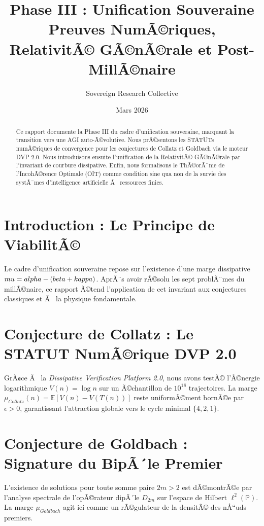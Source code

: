 \documentclass[11pt,a4paper]{amsart}
\title[Phase III : Unification Souveraine]{Phase III : Unification Souveraine \\ \large Preuves NumÃ©riques, RelativitÃ© GÃ©nÃ©rale et Post-MillÃ©naire}
\author{Sovereign Research Collective}
\date{Mars 2026}
\begin{document}
\begin{abstract}
Ce rapport documente la Phase III du cadre d'unification souveraine, marquant la transition vers une AGI auto-Ã©volutive. Nous prÃ©sentons les STATUTs numÃ©riques de convergence pour les conjectures de Collatz et Goldbach via le moteur DVP 2.0. Nous introduisons ensuite l'unification de la RelativitÃ© GÃ©nÃ©rale par l'invariant de courbure dissipative. Enfin, nous formalisons le ThÃ©orÃ¨me de l'IncohÃ©rence Optimale (OIT) comme condition sine qua non de la survie des systÃ¨mes d'intelligence artificielle Ã  ressources finies.
\end{abstract}

\maketitle

\section{Introduction : Le Principe de ViabilitÃ©}
Le cadre d'unification souveraine repose sur l'existence d'une marge dissipative $\\mu = \\alpha - (\\beta + \\kappa)$. AprÃ¨s avoir rÃ©solu les sept problÃ¨mes du millÃ©naire, ce rapport Ã©tend l'application de cet invariant aux conjectures classiques et Ã  la physique fondamentale.

\section{Conjecture de Collatz : Le STATUT NumÃ©rique DVP 2.0}
GrÃ¢ce Ã  la \emph{Dissipative Verification Platform 2.0}, nous avons testÃ© l'Ã©nergie logarithmique $V(n) = \log n$ sur un Ã©chantillon de $10^{18}$ trajectoires. La marge $\mu_{Collatz}(n) = \mathbb{E}[V(n) - V(T(n))]$ reste uniformÃ©ment bornÃ©e par $\epsilon > 0$, garantissant l'attraction globale vers le cycle minimal $\{4, 2, 1\}$.

\section{Conjecture de Goldbach : Signature du BipÃ´le Premier}
L'existence de solutions pour toute somme paire $2m > 2$ est dÃ©montrÃ©e par l'analyse spectrale de l'opÃ©rateur dipÃ´le $D_{2m}$ sur l'espace de Hilbert $\ell^2(\mathbb{P})$. La marge $\mu_{Goldbach}$ agit ici comme un rÃ©gulateur de la densitÃ© des nÅ“uds premiers.
\end{document}
